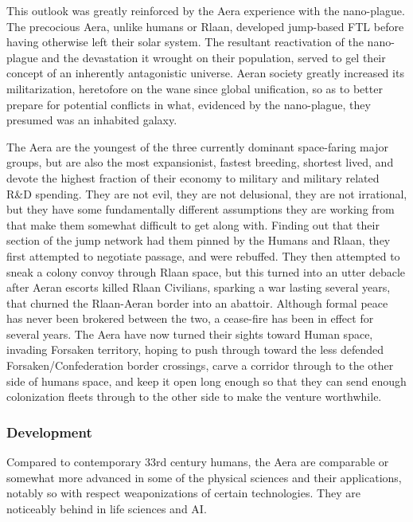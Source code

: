 This outlook was greatly reinforced by the Aera experience with the
nano-plague. The precocious Aera, unlike humans or Rlaan, developed
jump-based FTL before having otherwise left their solar system. The
resultant reactivation of the nano-plague and the devastation it
wrought on their population, served to gel their concept of an
inherently antagonistic universe. Aeran society greatly increased its
militarization, heretofore on the wane since global unification, so as
to better prepare for potential conflicts in what, evidenced by the
nano-plague, they presumed was an inhabited galaxy.

The Aera are the youngest of the three currently dominant space-faring
major groups, but are also the most expansionist, fastest breeding,
shortest lived, and devote the highest fraction of their economy to
military and military related R\&D spending. They are not evil, they
are not delusional, they are not irrational, but they have some
fundamentally different assumptions they are working from that make
them somewhat difficult to get along with. Finding out that their
section of the jump network had them pinned by the Humans and Rlaan,
they first attempted to negotiate passage, and were rebuffed. They
then attempted to sneak a colony convoy through Rlaan space, but this
turned into an utter debacle after Aeran escorts killed Rlaan
Civilians, sparking a war lasting several years, that churned the
Rlaan-Aeran border into an abattoir. Although formal peace has never
been brokered between the two, a cease-fire has been in effect for
several years. The Aera have now turned their sights toward Human
space, invading Forsaken territory, hoping to push through toward the
less defended Forsaken/Confederation border crossings, carve a
corridor through to the other side of humans space, and keep it open
long enough so that they can send enough colonization fleets through
to the other side to make the venture worthwhile.

\subsubsection{Development}
Compared to contemporary 33rd century humans, the Aera are comparable
or somewhat more advanced in some of the physical sciences and their
applications, notably so with respect weaponizations of certain
technologies. They are noticeably behind in life sciences and AI.

